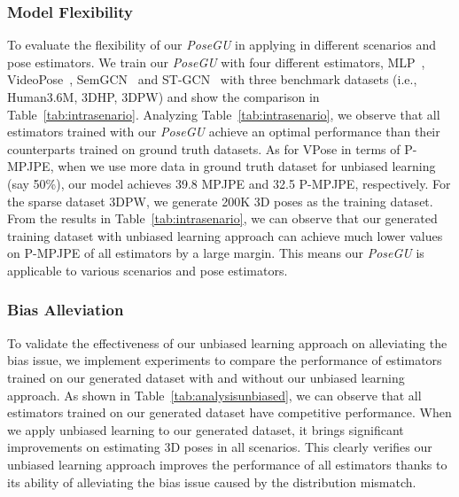 \documentclass[runningheads]{llncs}
\begin{document}
\subsubsection{Model Flexibility}
To evaluate the flexibility of our \textit{PoseGU} in applying in different scenarios and pose estimators.
We train our \textit{PoseGU} with four different estimators, MLP~\cite{mlp}, VideoPose~\cite{videopose}, SemGCN~\cite{semigcn} and ST-GCN~\cite{stgcn} with three benchmark datasets (i.e., Human3.6M, 3DHP, 3DPW) and show the comparison in Table~\ref{tab:intrasenario}. 
Analyzing Table~\ref{tab:intrasenario}, we observe that all estimators trained with our \textit{PoseGU} achieve an optimal performance than their counterparts trained on ground truth datasets.
As for VPose in terms of P-MPJPE, when we use more data in ground truth dataset for unbiased learning (say 50\%), our model achieves 39.8 MPJPE and 32.5 P-MPJPE, respectively.
For the sparse dataset 3DPW, we generate 200K 3D poses as the training dataset. 
From the results in Table~\ref{tab:intrasenario}, we can observe that our generated training dataset with unbiased learning approach can achieve much lower values on P-MPJPE of all estimators by a large margin. 
This means our \textit{PoseGU} is applicable to various scenarios and pose estimators.

\subsubsection{Bias Alleviation} 
To validate the effectiveness of our unbiased learning approach on alleviating the bias issue, we implement experiments to compare the performance of estimators trained on our generated dataset with and without our unbiased learning approach. 
As shown in Table~\ref{tab:analysisunbiased}, we can observe that all estimators trained on our generated dataset have competitive performance.
When we apply unbiased learning to our generated dataset, it brings significant improvements on estimating 3D poses in all scenarios. This clearly verifies our unbiased learning approach improves the performance of all estimators thanks to its ability of alleviating the bias issue caused by the distribution mismatch. 
\end{document}

